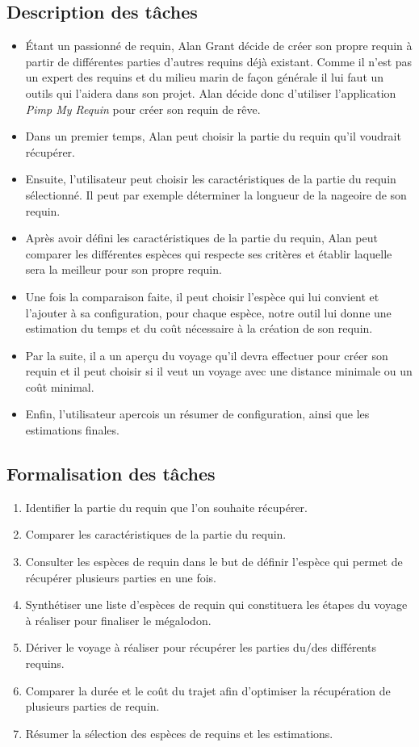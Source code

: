 \documentclass{article}
\begin{document}
\subsection{Description des tâches}
\begin{itemize}
	\item Étant un passionné de requin, Alan Grant décide de créer son propre requin à partir de différentes parties d'autres requins déjà existant. Comme il n'est pas un expert des requins et du milieu marin de façon générale il lui faut un outils qui l'aidera dans son projet. Alan décide donc d'utiliser l'application \textit{Pimp My Requin} pour créer son requin de rêve.
	\item Dans un premier temps, Alan peut choisir la partie du requin qu'il voudrait récupérer.
	\item Ensuite, l'utilisateur peut choisir les caractéristiques de la partie du requin sélectionné. Il peut par exemple déterminer la longueur de la nageoire de son requin.
	\item Après avoir défini les caractéristiques de la partie du requin, Alan peut comparer les différentes espèces qui respecte ses critères et établir laquelle sera la meilleur pour son propre requin.
	\item Une fois la comparaison faite, il peut choisir l'espèce qui lui convient et l'ajouter à sa configuration, pour chaque espèce, notre outil lui donne une estimation du temps et du coût nécessaire à la création de son requin.
	\item Par la suite, il a un aperçu du voyage qu'il devra effectuer pour créer son requin et il peut choisir si il veut un voyage avec une distance minimale ou un coût minimal.
	\item Enfin, l'utilisateur apercois un résumer de configuration, ainsi que les estimations finales.
\end{itemize}

\subsection{Formalisation des tâches}
\begin{enumerate}
	\item Identifier la partie du requin que l’on souhaite récupérer.
	\item Comparer les caractéristiques de la partie du requin.
	\item Consulter les espèces de requin dans le but de définir l’espèce qui permet de récupérer plusieurs parties en une fois.
	\item Synthétiser une liste d’espèces de requin qui constituera les étapes du voyage à réaliser pour finaliser le mégalodon.
	\item Dériver le voyage à réaliser pour récupérer les parties du/des différents requins.
	\item Comparer la durée et le coût du trajet afin d’optimiser la récupération de plusieurs parties de requin.
	\item Résumer la sélection des espèces de requins et les estimations.
\end{enumerate}
\end{document}
